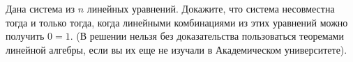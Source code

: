 Дана система из $n$ линейных уравнений. Докажите, что система несовместна тогда и только тогда, когда линейными комбинациями
из этих уравнений можно получить $0 = 1$. (В решении нельзя без доказательства пользоваться теоремами линейной алгебры, если
вы их еще не изучали в Академическом университете).
